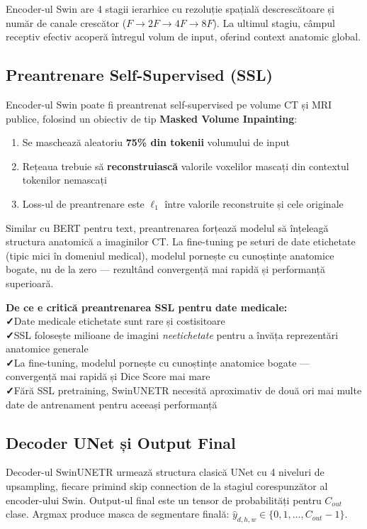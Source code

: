 \documentclass[12pt, a4paper]{report}
\newcommand{\pro}{\textcolor{accentgreen}{\textbf{✓}}\;}
\begin{document}
Encoder-ul Swin are 4 stagii ierarhice cu rezoluție spațială descrescătoare și
număr de canale crescător ($F \to 2F \to 4F \to 8F$). La ultimul stagiu, câmpul
receptiv efectiv acoperă întregul volum de input, oferind context anatomic global.

\subsection{Preantrenare Self-Supervised (SSL)}

Encoder-ul Swin poate fi preantrenat self-supervised pe volume CT și MRI publice,
folosind un obiectiv de tip \textbf{Masked Volume Inpainting}:

\begin{enumerate}
    \item Se maschează aleatoriu \textbf{75\% din tokenii} volumului de input
    \item Rețeaua trebuie să \textbf{reconstruiască} valorile voxelilor mascați
          din contextul tokenilor nemascați
    \item Loss-ul de preantrenare este $\ell_1$ între valorile reconstruite și cele originale
\end{enumerate}

Similar cu BERT pentru text, preantrenarea forțează modelul să înțeleagă structura
anatomică a imaginilor CT. La fine-tuning pe seturi de date etichetate (tipic mici
în domeniul medical), modelul pornește cu cunoștințe anatomice bogate, nu de la
zero — rezultând convergență mai rapidă și performanță superioară.


\textbf{De ce e critică preantrenarea SSL pentru date medicale:}\\
\pro Date medicale etichetate sunt rare și costisitoare \\
\pro SSL folosește milioane de imagini \textit{neetichetate} pentru a învăța
    reprezentări anatomice generale \\
\pro La fine-tuning, modelul pornește cu cunoștințe anatomice bogate — convergență
    mai rapidă și Dice Score mai mare \\
\pro Fără SSL pretraining, SwinUNETR necesită aproximativ de două ori mai multe
    date de antrenament pentru aceeași performanță


\subsection{Decoder UNet și Output Final}

Decoder-ul SwinUNETR urmează structura clasică UNet cu 4 niveluri de upsampling,
fiecare primind skip connection de la stagiul corespunzător al encoder-ului Swin.
Output-ul final este un tensor de probabilități pentru $C_{out}$ clase.
Argmax produce masca de segmentare finală:
$\hat{y}_{d,h,w} \in \{0, 1, \ldots, C_{out}-1\}$.
\end{document}
